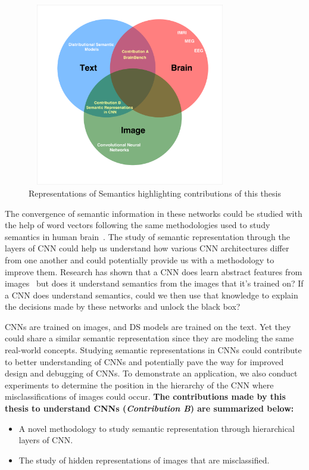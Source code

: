 \begin{figure}[t]
\centering
\includegraphics[width=9cm, height=8cm]{Figures/semantics}
\caption{ Representations of Semantics highlighting contributions of this thesis}
\label{Representations}
\end{figure} 

The convergence of semantic information in these networks could be studied with the help of word vectors following the same methodologies used to study semantics in human brain~\cite{Mitchell1191, MurphyEEG, SUDRE2012451}. The study of semantic representation through the layers of CNN could help us understand how various CNN architectures differ from one another and could potentially provide us with a methodology to improve them. Research has shown that a CNN does learn abstract features from images~\cite{CNNVisual1} but does it understand semantics from the images that it's trained on? If a CNN does understand semantics, could we then use that knowledge to explain the decisions made by these networks and unlock the black box?

CNNs are trained on images, and  DS models are trained on the text. Yet they could share a similar semantic representation since they are modeling the same real-world concepts. Studying semantic representations in CNNs could contribute to better understanding of CNNs and potentially pave the way for improved design and debugging of CNNs. To demonstrate an application, we also conduct experiments to determine the position in the hierarchy of the CNN where misclassifications of images could occur.
\bigbreak
\noindent \textbf{The contributions made by this thesis to understand CNNs  (\textit{Contribution B}) are summarized below:}
\begin{itemize}
\item{A novel methodology to study semantic representation through hierarchical layers of CNN.}
\item{The study of hidden representations of images that are misclassified.}
\end{itemize}

